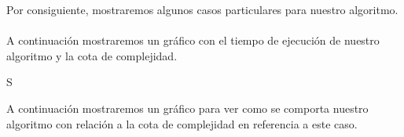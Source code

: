 \indent Por consiguiente, mostraremos algunos casos particulares para nuestro algoritmo.\\

\\
A continuación mostraremos un gráfico con el tiempo de ejecución de nuestro algoritmo y la cota de complejidad.\\

\vspace*{0.3cm} \vspace*{0.3cm}
  \begin{center}
  \end{center}
  \vspace*{0.3cm}


S%

  

A continuación mostraremos un gráfico para ver como se comporta nuestro algoritmo con relación a la cota de complejidad en referencia a este caso.

\vspace*{0.3cm} \vspace*{0.3cm}
  \begin{center}
  \end{center}
  \vspace*{0.3cm}
  
